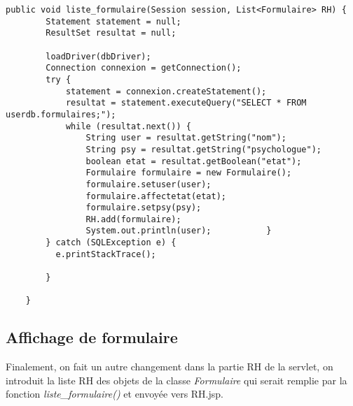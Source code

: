 \documentclass[12]{article}
\begin{document}
\lstset{language=java}
\begin{lstlisting}
public void liste_formulaire(Session session, List<Formulaire> RH) {
        Statement statement = null;
        ResultSet resultat = null;

        loadDriver(dbDriver);
        Connection connexion = getConnection();
        try {
            statement = connexion.createStatement();
            resultat = statement.executeQuery("SELECT * FROM userdb.formulaires;");
            while (resultat.next()) {
                String user = resultat.getString("nom");
                String psy = resultat.getString("psychologue");
                boolean etat = resultat.getBoolean("etat");
                Formulaire formulaire = new Formulaire();
                formulaire.setuser(user);
                formulaire.affectetat(etat);
                formulaire.setpsy(psy);
                RH.add(formulaire);
                System.out.println(user);           }
        } catch (SQLException e) {
          e.printStackTrace();
            
        }
       
    }
\end{lstlisting}

\subsection{Affichage de formulaire}

Finalement, on fait un autre changement dans la partie RH de la servlet, on introduit la liste RH des objets de la classe \textit{Formulaire} qui serait remplie par la fonction \textit{liste\_formulaire()} et envoyée vers RH.jsp.
\end{document}
